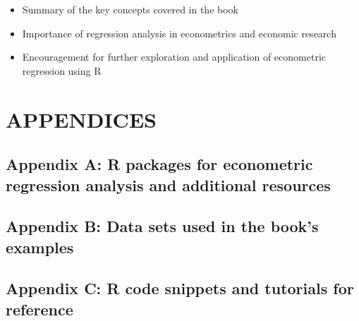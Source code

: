 \documentclass[
  letterpaper,
  twoside,
  openany]{scrbook}
\begin{document}
\begin{itemize}
\item
  Summary of the key concepts covered in the book
\item
  Importance of regression analysis in econometrics and economic
  research
\item
  Encouragement for further exploration and application of econometric
  regression using R
\end{itemize}

\part{APPENDICES}


\hypertarget{appendix-a-r-packages-for-econometric-regression-analysis-and-additional-resources}{%
\chapter*{Appendix A: R packages for econometric regression analysis and
additional
resources}\label{appendix-a-r-packages-for-econometric-regression-analysis-and-additional-resources}}


\hypertarget{appendix-b-data-sets-used-in-the-books-examples}{%
\chapter*{Appendix B: Data sets used in the book's
examples}\label{appendix-b-data-sets-used-in-the-books-examples}}


\hypertarget{appendix-c-r-code-snippets-and-tutorials-for-reference}{%
\chapter*{Appendix C: R code snippets and tutorials for
reference}\label{appendix-c-r-code-snippets-and-tutorials-for-reference}}
\end{document}
